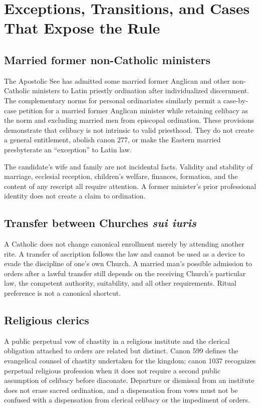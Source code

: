 \section{Exceptions, Transitions, and Cases That Expose the Rule}

\subsection{Married former non-Catholic ministers}

The Apostolic See has admitted some married former Anglican and other non-Catholic ministers to Latin priestly ordination after individualized discernment. The complementary norms for personal ordinariates similarly permit a case-by-case petition for a married former Anglican minister while retaining celibacy as the norm and excluding married men from episcopal ordination. These provisions demonstrate that celibacy is not intrinsic to valid priesthood. They do not create a general entitlement, abolish canon 277, or make the Eastern married presbyterate an ``exception'' to Latin law.

The candidate's wife and family are not incidental facts. Validity and stability of marriage, ecclesial reception, children's welfare, finances, formation, and the content of any rescript all require attention. A former minister's prior professional identity does not create a claim to ordination.

\subsection{Transfer between Churches \emph{sui iuris}}

A Catholic does not change canonical enrollment merely by attending another rite. A transfer of ascription follows the law and cannot be used as a device to evade the discipline of one's own Church. A married man's possible admission to orders after a lawful transfer still depends on the receiving Church's particular law, the competent authority, suitability, and all other requirements. Ritual preference is not a canonical shortcut.

\subsection{Religious clerics}

A public perpetual vow of chastity in a religious institute and the clerical obligation attached to orders are related but distinct. Canon 599 defines the evangelical counsel of chastity undertaken for the kingdom; canon 1037 recognizes perpetual religious profession when it does not require a second public assumption of celibacy before diaconate. Departure or dismissal from an institute does not erase sacred ordination, and a dispensation from vows must not be confused with a dispensation from clerical celibacy or the impediment of orders.

